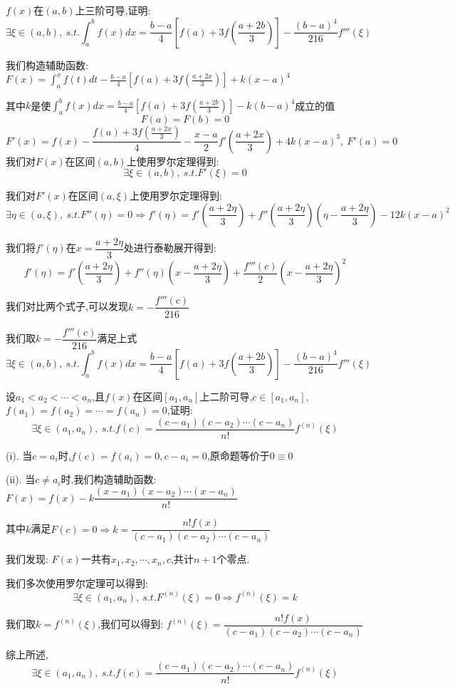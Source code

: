 \begin{proposition}
	$f(x)$在$(a,b)$上三阶可导,证明: $$\exists\xi\in(a,b),\ s.t. \int_{a}^{b}f(x)dx=\frac{b-a}{4}\left[f(a)+3f(\frac{a+2b}{3}) \right]-\frac{(b-a)^4}{216}f'''(\xi) $$
\end{proposition}
\begin{solution}

	我们构造辅助函数: $F(x)=\int_{a}^{x}f(t)dt-\frac{b-a}{4}[f(a)+3f(\frac{a+2x}{3})]+k(x-a)^4$

	其中$k$是使$\int_{a}^{b}f(x)dx=\frac{b-a}{4}\left[f(a)+3f(\frac{a+2b}{3}) \right]-k(b-a)^4$成立的值
	$$F(a)=F(b)=0$$
	$$F'(x)=f(x)-\dfrac{f(a)+3f(\frac{a+2x}{3})}{4}-\dfrac{x-a}{2}f'(\dfrac{a+2x}{3})+4k(x-a)^3,\ F'(a)=0$$
	我们对$F(x)$在区间$(a,b)$上使用罗尔定理得到:
	$$\exists \xi\in(a,b),\ s.t. F'(\xi)=0$$

	我们对$F'(x)$在区间$(a,\xi)$上使用罗尔定理得到:
	$$\exists \eta\in(a,\xi),\ s.t. F''(\eta)=0\Rightarrow f'(\eta)=f'(\dfrac{a+2\eta}{3})+f''(\dfrac{a+2\eta}{3})(\eta-\dfrac{a+2\eta}{3})-12k(x-a)^2$$

	我们将$f'(\eta)$在$x=\dfrac{a+2\eta}{3}$处进行泰勒展开得到:
	$$f'(\eta)=f'(\dfrac{a+2\eta}{3})+f''(\eta)(x-\dfrac{a+2\eta}{3})+\dfrac{f'''(c)}{2}(x-\dfrac{a+2\eta}{3})^2$$

	我们对比两个式子,可以发现$k=-\dfrac{f'''(c)}{216}$

	我们取$k=-\dfrac{f'''(c)}{216}$满足上式
	$$\exists\xi\in(a,b),\ s.t. \int_{a}^{b}f(x)dx=\frac{b-a}{4}\left[f(a)+3f(\frac{a+2b}{3}) \right]-\frac{(b-a)^4}{216}f'''(\xi) $$
\end{solution}


\begin{proposition}
	设$a_{1}<a_{2}<\cdots<a_{n}$,且$f(x)$在区间$[a_{1},a_{n}]$上二阶可导,$c\in[a_{1},a_{n}]$,$f(a_{1})=f(a_{2})=\cdots=f(a_{n})=0$,证明: $$\exists \xi\in(a_{1},a_{n}),\ s.t. f(c)=\dfrac{(c-a_{1})(c-a_{2})\cdots(c-a_{n})}{n!}f^{(n)}(\xi)$$
\end{proposition}
\begin{solution}

	(i). 当$c=a_{i}$时,$f(c)=f(a_{i})=0,c-a_{i}=0$,原命题等价于$0\equiv  0$

	(ii). 当$c\neq a_{i}$时,我们构造辅助函数: $F(x)=f(x)-k\dfrac{(x-a_{1})(x-a_{2})\cdots(x-a_{n})}{n!}$

	其中$k$满足$F(c)=0\Rightarrow k=\dfrac{n!f(x)}{(c-a_{1})(c-a_{2})\cdots(c-a_{n})}$

	我们发现: $F(x)$一共有$x_{1},x_{2},\cdots,x_{n},c$,共计$n+1$个零点.

	我们多次使用罗尔定理可以得到:
	$$\exists \xi\in(a_{1},a_{n}),\ s.t. F^{(n)}(\xi)=0\Rightarrow f^{(n)}(\xi)=k$$

	我们取$k=f^{(n)}(\xi)$,我们可以得到: $f^{(n)}(\xi)=\dfrac{n!f(x)}{(c-a_{1})(c-a_{2})\cdots(c-a_{n})}$

	综上所述,$$\exists \xi\in(a_{1},a_{n}),\ s.t. f(c)=\dfrac{(c-a_{1})(c-a_{2})\cdots(c-a_{n})}{n!}f^{(n)}(\xi)$$
\end{solution}

